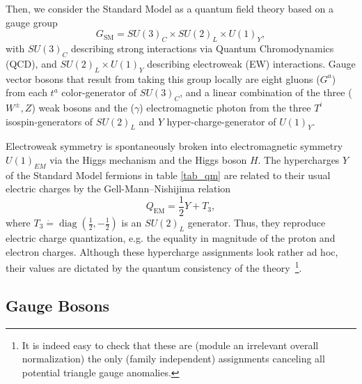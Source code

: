 Then, we consider the Standard Model as a quantum field theory based on a gauge group
\begin{equation}
	G_{\mathrm{SM}}=S U(3)_C \times S U(2)_{L} \times U(1)_{Y},
\end{equation}
with $S U(3)_C$ describing strong interactions via Quantum Chromodynamics (QCD), and $S U(2)_{L} \times U(1)_{Y}$ describing electroweak (EW) interactions. Gauge vector bosons that result from taking this group locally are eight gluons ($G^a$) from each $t^a$ color-generator of $SU(3)_C$, and a linear combination of the three ($W^\pm, Z$) weak bosons and the ($\gamma$) electromagnetic photon from the three $T^i$ isospin-generators of $SU(2)_L$ and $Y$ hyper-charge-generator of $U(1)_Y$.

Electroweak symmetry is spontaneously broken into electromagnetic symmetry $U(1)_{EM}$ via the Higgs mechanism and the Higgs boson $H$. The hypercharges $Y$ of the Standard Model fermions in table \ref{tab_qm} are related to their usual electric charges by the Gell-Mann–Nishijima relation~\parencite{10.1143/PTP.10.581} 
\begin{equation}
	Q_{\mathrm{EM}}=\frac12Y+T_{3}, \label{eq:Gell-Mann-Nishijima}
\end{equation}
where $T_{3}\dot=\operatorname{diag}\left(\frac{1}{2},-\frac{1}{2}\right)$ is an $S U(2)_{L}$ generator.  Thus, they reproduce electric charge quantization, e.g. the equality in magnitude of the proton and electron charges. Although these hypercharge assignments look rather ad hoc, their values are dictated by the quantum consistency of the theory~\footnote{It is indeed easy to check that these are (module an irrelevant overall normalization) the only (family independent) assignments canceling all potential triangle gauge anomalies.}. 

\subsection{Gauge Bosons}

